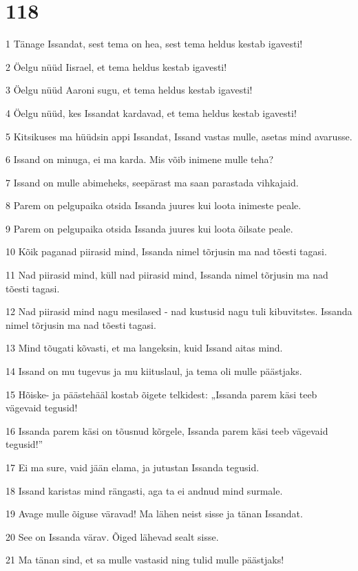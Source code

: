 \chapter{118}

\par 1 Tänage Issandat, sest tema on hea, sest tema heldus kestab igavesti!
\par 2 Öelgu nüüd Iisrael, et tema heldus kestab igavesti!
\par 3 Öelgu nüüd Aaroni sugu, et tema heldus kestab igavesti!
\par 4 Öelgu nüüd, kes Issandat kardavad, et tema heldus kestab igavesti!
\par 5 Kitsikuses ma hüüdsin appi Issandat, Issand vastas mulle, asetas mind avarusse.
\par 6 Issand on minuga, ei ma karda. Mis võib inimene mulle teha?
\par 7 Issand on mulle abimeheks, seepärast ma saan parastada vihkajaid.
\par 8 Parem on pelgupaika otsida Issanda juures kui loota inimeste peale.
\par 9 Parem on pelgupaika otsida Issanda juures kui loota õilsate peale.
\par 10 Kõik paganad piirasid mind, Issanda nimel tõrjusin ma nad tõesti tagasi.
\par 11 Nad piirasid mind, küll nad piirasid mind, Issanda nimel tõrjusin ma nad tõesti tagasi.
\par 12 Nad piirasid mind nagu mesilased - nad kustusid nagu tuli kibuvitstes. Issanda nimel tõrjusin ma nad tõesti tagasi.
\par 13 Mind tõugati kõvasti, et ma langeksin, kuid Issand aitas mind.
\par 14 Issand on mu tugevus ja mu kiituslaul, ja tema oli mulle päästjaks.
\par 15 Hõiske- ja päästehääl kostab õigete telkidest: „Issanda parem käsi teeb vägevaid tegusid!
\par 16 Issanda parem käsi on tõusnud kõrgele, Issanda parem käsi teeb vägevaid tegusid!”
\par 17 Ei ma sure, vaid jään elama, ja jutustan Issanda tegusid.
\par 18 Issand karistas mind rängasti, aga ta ei andnud mind surmale.
\par 19 Avage mulle õiguse väravad! Ma lähen neist sisse ja tänan Issandat.
\par 20 See on Issanda värav. Õiged lähevad sealt sisse.
\par 21 Ma tänan sind, et sa mulle vastasid ning tulid mulle päästjaks!
